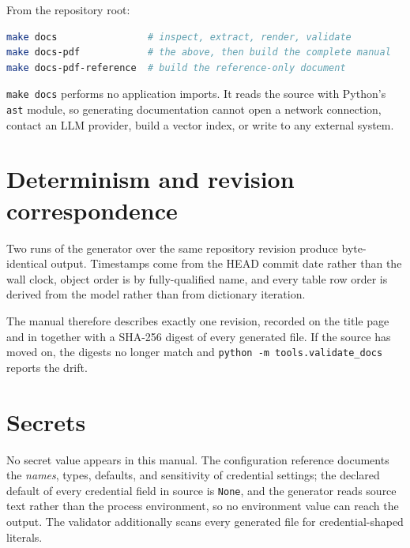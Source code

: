 From the repository root:

\begin{lstlisting}[language=bash]
make docs                # inspect, extract, render, validate
make docs-pdf            # the above, then build the complete manual
make docs-pdf-reference  # build the reference-only document
\end{lstlisting}

\texttt{make docs} performs no application imports. It reads the source with
Python's \texttt{ast} module, so generating documentation cannot open a network
connection, contact an LLM provider, build a vector index, or write to any
external system.

\section*{Determinism and revision correspondence}

Two runs of the generator over the same repository revision produce
byte-identical output. Timestamps come from the HEAD commit date rather than
the wall clock, object order is by fully-qualified name, and every table row
order is derived from the model rather than from dictionary iteration.

The manual therefore describes exactly one revision, recorded on the title page
and in  together with a
SHA-256 digest of every generated file. If the source has moved on, the digests
no longer match and \texttt{python -m tools.validate\_docs} reports the drift.

\section*{Secrets}

No secret value appears in this manual. The configuration reference documents
the \emph{names}, types, defaults, and sensitivity of credential settings; the
declared default of every credential field in source is \texttt{None}, and the
generator reads source text rather than the process environment, so no
environment value can reach the output. The validator additionally scans every
generated file for credential-shaped literals.
